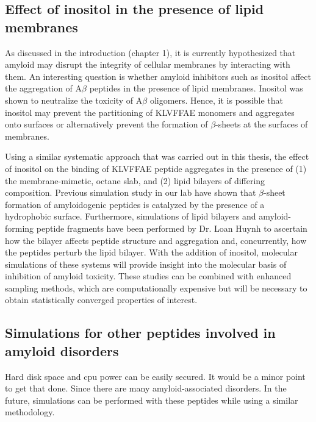 \subsection{Effect of inositol in the presence of lipid membranes}
As discussed in the introduction (chapter 1), it is currently hypothesized that amyloid may disrupt the integrity of cellular membranes by interacting with them. An interesting question is whether amyloid inhibitors such as inositol affect the aggregation of A$\beta$ peptides in the presence of lipid membranes. Inositol was shown to neutralize the toxicity of A$\beta$ oligomers.\cite{McLaurin:2000bq}  Hence, it is possible that inositol may prevent the partitioning of KLVFFAE monomers and aggregates onto surfaces or alternatively prevent the formation of $\beta$-sheets at the surfaces of membranes.\cite{references}

Using a similar systematic approach that was carried out in this thesis, the effect of inositol on the binding of KLVFFAE peptide aggregates in the presence of (1) the membrane-mimetic, octane slab, and (2) lipid bilayers of differing composition. Previous simulation study in our lab have shown that $\beta$-sheet formation of amyloidogenic peptides is catalyzed by the presence of a hydrophobic surface.\cite{Nikolic:2010go} Furthermore, simulations of lipid bilayers and amyloid-forming peptide fragments have been performed by Dr. Loan Huynh to ascertain how the bilayer affects peptide structure and aggregation and, concurrently, how the peptides perturb the lipid bilayer. With the addition of inositol, molecular simulations of these systems will provide insight into the  molecular basis of inhibition of amyloid toxicity. These studies can be combined with enhanced sampling methods,\cite{TVREX, STDR} which are computationally expensive but will be necessary to obtain statistically converged properties of interest.

\subsection{Simulations for other peptides involved in amyloid disorders}
Hard disk space and cpu power can be easily secured.  It would be a minor point to get that done.  Since there are many amyloid-associated disorders. In the future, simulations can be performed with these peptides while using a similar methodology. 


